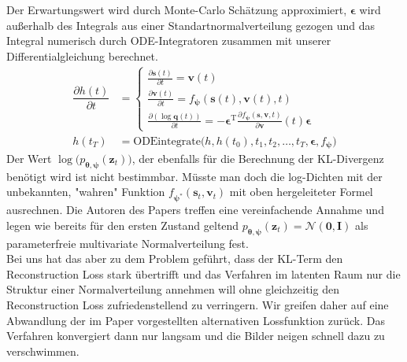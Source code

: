 \documentclass[12pt]{article}
\begin{document}
	Der Erwartungswert wird durch Monte-Carlo Schätzung approximiert, $\boldsymbol\epsilon$ wird außerhalb des Integrals aus einer Standartnormalverteilung gezogen und das Integral numerisch durch ODE-Integratoren zusammen mit unserer Differentialgleichung berechnet.\\
	\begin{align*}
	\dfrac{\partial h(t)}{\partial t}&=\begin{cases*}
	\tfrac{\partial \mathbf{s}(t)}{\partial t}=\mathbf v(t) \\
	\tfrac{\partial \mathbf{v}(t)}{\partial t}=f_{\boldsymbol{\psi}}(\mathbf s(t), \mathbf v(t), t) \\
	\tfrac{\partial (\log\mathbf{q}(t))}{\partial t}= -\boldsymbol\epsilon^\mathrm{T}\tfrac{\partial f_{\boldsymbol\psi}(\mathbf{s},\mathbf{v},t)}{\partial\mathbf{v}}(t)\boldsymbol\epsilon
	\end{cases*}\\ h(t_T)&=\text{ODEintegrate}\big(h,h(t_0),t_1,t_2,\ldots,t_T,\boldsymbol\epsilon,f_{\boldsymbol\psi}\big)
	\end{align*}
	Der Wert
	$\log\big(p_{\boldsymbol\theta,\boldsymbol\psi}(\mathbf{z}_{t}) \big)$, der ebenfalls für die Berechnung der KL-Divergenz benötigt wird ist nicht bestimmbar. Müsste man doch die log-Dichten mit der unbekannten, "wahren" Funktion $f_{\boldsymbol\psi^{*}}(\mathbf{s}_{t},\mathbf{v}_{t})$ mit oben hergeleiteter Formel ausrechnen.
	Die Autoren des Papers treffen eine vereinfachende Annahme und legen wie bereits für den ersten Zustand geltend $p_{\boldsymbol\theta,\boldsymbol\psi}(\mathbf{z}_{t}) = \mathcal{N}(\mathbf{0},\mathbf{I})$ als parameterfreie multivariate Normalverteilung fest.\\
	Bei uns hat das aber zu dem Problem geführt, dass der KL-Term den Reconstruction Loss stark übertrifft und das Verfahren im latenten Raum nur die Struktur einer Normalverteilung annehmen will ohne gleichzeitig den Reconstruction Loss zufriedenstellend zu verringern. Wir greifen daher auf eine Abwandlung der im Paper vorgestellten alternativen Lossfunktion zurück. Das Verfahren konvergiert dann nur langsam und die Bilder neigen schnell dazu zu verschwimmen. \\
\end{document}
